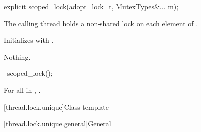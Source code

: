 %
\begin{itemdecl}
explicit scoped_lock(adopt_lock_t, MutexTypes&... m);
\end{itemdecl}

\begin{itemdescr}
\pnum
\expects
The calling thread holds a non-shared lock on each element of .

\pnum
\effects
Initializes  with .

\pnum
\throws
Nothing.
\end{itemdescr}

%
\begin{itemdecl}
~scoped_lock();
\end{itemdecl}

\begin{itemdescr}
\pnum
\effects
For all  in ,
.
\end{itemdescr}

[thread.lock.unique]{Class template }

[thread.lock.unique.general]{General}


